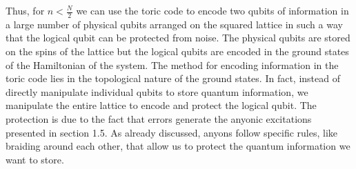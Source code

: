 \documentclass{Configuration_Files/PoliMi3i_thesis}
\begin{document}
Thus, for $n < \frac{N}{2}$ we can use the toric code to encode two qubits of information in a large number of physical qubits arranged on the squared lattice in such a way that the logical qubit can be protected from noise. The physical qubits are stored on the spins of the lattice but the logical qubits are encoded in the ground states of the Hamiltonian of the system. 
The method for encoding information in the toric code lies in the topological nature of the ground states. In fact, instead of directly manipulate individual qubits to store quantum information, we manipulate the entire lattice to encode and protect the logical qubit. The protection is due to the fact that errors generate the anyonic excitations presented in section 1.5. As already discussed, anyons follow specific rules, like braiding around each other, that allow us to protect the quantum information we want to store.\newline 

\end{document}
